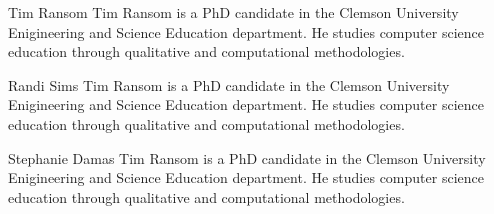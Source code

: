 \documentclass[
  journal,
]{IEEEtran}%
\begin{document}
\pagebreak[3]
\begin{IEEEbiography}{Tim Ransom}
Tim Ransom is a PhD candidate in the Clemson University Enigineering and
Science Education department. He studies computer science education
through qualitative and computational methodologies.
\end{IEEEbiography}
\begin{IEEEbiography}{Randi Sims}
Tim Ransom is a PhD candidate in the Clemson University Enigineering and
Science Education department. He studies computer science education
through qualitative and computational methodologies.
\end{IEEEbiography}
\begin{IEEEbiography}{Stephanie
Damas}
Tim Ransom is a PhD candidate in the Clemson University Enigineering and
Science Education department. He studies computer science education
through qualitative and computational methodologies.
\end{IEEEbiography}
\end{document}
